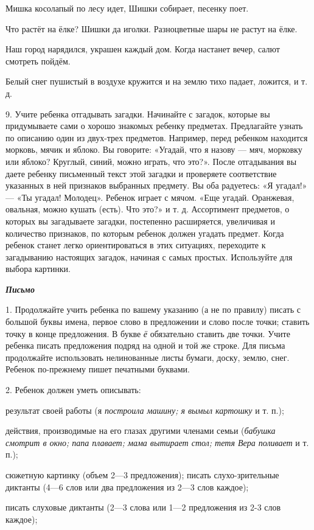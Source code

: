 \documentclass[a5paper]{book}
\renewcommand{\emph}[1]{\textit{#1}}
\begin{document}
Мишка косолапый по лесу идет, Шишки собирает, песенку поет.

Что растёт на ёлке? Шишки да иголки. Разноцветные шары не растут на
ёлке.

Наш город нарядился, украшен каждый дом. Когда настанет вечер, салют
смотреть пойдём.

Белый снег пушистый в воздухе кружится и на землю тихо падает, ложится,
и т. д.

9. Учите ребенка отгадывать загадки. Начинайте с загадок, которые вы
придумываете сами о хорошо знакомых ребенку предметах. Предлагайте
узнать по описанию один из двух-трех предметов. Например, перед ребенком
находится морковь, мячик и яблоко. Вы говорите: «Угадай, что я назову
--- мяч, морковку или яблоко? Круглый, синий, можно играть, что это?».
После отгадывания вы даете ребенку письменный текст этой загадки и
проверяете соответствие указанных в ней признаков выбранных предмету. Вы
оба радуетесь: «Я угадал!» --- «Ты угадал! Молодец». Ребенок играет с
мячом. «Еще угадай. Оранжевая, овальная, можно кушать (есть). Что это?»
и т. д. Ассортимент предметов, о которых вы загадываете загадки,
постепенно расширяется, увеличивая и количество признаков, по которым
ребенок должен угадать предмет. Когда ребенок станет легко
ориентироваться в этих ситуациях, переходите к загадыванию настоящих
загадок, начиная с самых простых. Используйте для выбора картинки.

\emph{\textbf{Письмо}}

1. Продолжайте учить ребенка по вашему указанию (а не по правилу) писать
с большой буквы имена, первое слово в предложении и слово после точки;
ставить точку в конце предложения. В букве \emph{ё} обязательно ставить
две точки. Учите ребенка писать предложения подряд на одной и той же
строке. Для письма продолжайте использовать нелинованные листы бумаги,
доску, землю, снег. Ребенок по-прежнему пишет печатными буквами.

2. Ребенок должен уметь описывать:

результат своей работы (я \emph{построила машину; я вымыл картошку} и т.
п.);

действия, производимые на его глазах другими членами семьи
(\emph{бабушка смотрит в окно; папа плавает; мама вытирает стол; тетя
Вера поливает} и т. п.);

сюжетную картинку (объем 2---3 предложения); писать слухо-зрительные
диктанты (4---6 слов или два предложения из 2---3 слов каждое);

писать слуховые диктанты (2---3 слова или 1---2 предложения из 2-3 слов
каждое);
\end{document}
